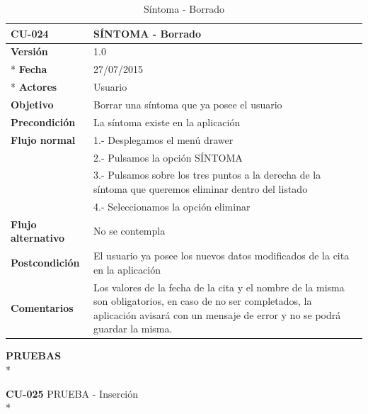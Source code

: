 \documentclass[../pfc.tex]{subfiles}
\begin{document}
	\begin{table}[H]
		\centering
		\begin{tabular}[t]{|p{3cm}|p{9.5cm}|}
			\hline \textbf{CU-024} & \textbf{SÍNTOMA - Borrado} \\*
			\hline\hline \textbf{Versión} & 1.0 \\ *
			\hline\hline \textbf{Fecha} & 27/07/2015 \\ *
			\hline\textbf{Actores} 	& Usuario\\*
			\hline \textbf{Objetivo} & Borrar una síntoma que ya posee el usuario\\* 			
			\hline \textbf{Precondición} & La síntoma existe en la aplicación\\* 
			\hline \textbf{Flujo normal} & 1.- Desplegamos el menú drawer \\* 
			& 2.- Pulsamos la opción SÍNTOMA\\*	
			& 3.- Pulsamos sobre los tres puntos a la derecha de la síntoma que queremos eliminar dentro del listado\\*	
			& 4.- Seleccionamos la opción eliminar\\*	
			\hline \textbf{Flujo alternativo} & No se contempla \\* 
			\hline \textbf{Postcondición} & El usuario ya posee los nuevos datos modificados de la cita en la aplicación \\* 
			\hline \textbf{Comentarios}   & Los valores de la fecha de la cita y el nombre de la misma son obligatorios, en caso de no ser completados, la aplicación avisará con un mensaje de error y no se podrá guardar la misma.\\*
			\hline
		\end{tabular}
		\caption{Síntoma - Borrado}
		\label{tabla:caso024}
	\end{table}
	
	
	
	\textbf{PRUEBAS}\\*
	
	\textbf{CU-025}	PRUEBA - Inserción\\*
	
\end{document}
